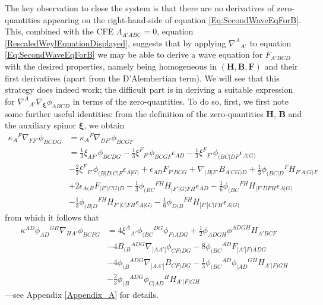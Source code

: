\documentclass[10pt,a4paper]{article}
\theoremstyle{plain}
\def\bmB{{\bm B}}
\def\bmF{{\bm F}}
\def\bmH{{\bm H}}
\begin{document}
The key observation to close the system is that there are no derivatives of zero-quantities
appearing on the right-hand-side of equation \eqref{Eq:SecondWaveEqForB}. This,
combined with the CFE $\Lambda_{A'ABC}=0$, equation \eqref{RescaledWeylEquationDisplayed},
suggests
that by applying $\nabla^A{}_{A'}$ to equation
\eqref{Eq:SecondWaveEqForB} we may be able to derive a wave equation
for $F_{A'BCD}$ with the desired properties, namely being homogeneous
in $(\bmH, \bmB, \bmF)$ and their first derivatives (apart from the
D'Alembertian term). We will see that this strategy does indeed work;
the difficult part is in deriving a suitable expression for
$\nabla^A{}_{A'}\nabla_{\bm\xi}\phi_{ABCD}$ in terms of the zero-quantities. To do so, first, we first note some further useful identities: from the definition
of the zero-quantities $\bmH$, $\bmB$ and the auxiliary spinor
$\bm\xi$, we obtain
\begin{align}
    \kappa_{A}{}^{F} \nabla_{FF'}\phi_{BCDG} &=\kappa_{A}{}^{F}
    \nabla_{DF'}\phi_{BCGF} \nonumber\\ &= \tfrac{1}{3} \xi_{AF'}
    \phi_{BCDG} - \tfrac{1}{3} \xi^{F}{}_{F'} \phi_{BCGF}
    \epsilon_{AD} - \tfrac{1}{3}
    \xi^{F}{}_{F'}\phi_{(BC|DF}\epsilon_{A|G)} \nonumber \\ & -
    \tfrac{2}{3} \xi^{F}{}_{F'}\phi_{(B|D|C|F}\epsilon_{A|G)} +
    \epsilon_{AD} F_{F'BCG} + \nabla_{(B|F'}B_{A|CG)D} + \tfrac{1}{3}
    \phi_{(BC|D}{}^{F}H_{F'A|G)F} \nonumber \\& + 2
    \epsilon_{A(B}F_{|F'\vert CG)D} - \tfrac{1}{3}
    \phi_{(BC}{}^{FH}H_{|F'|G)FH}\epsilon_{AD} - \tfrac{1}{6}
    \phi_{(BC}{}^{FH}H_{|F'DFH}\epsilon_{A|G)} \nonumber\\ & -
    \tfrac{1}{3} \phi_{(B|D}{}^{FH}H_{F'|C|FH}\epsilon_{A|G)} -
    \tfrac{1}{6}
    \phi_{D(B}{}^{FH}H_{|F'|C|FH}\epsilon_{A|G)}\label{Eq:MiscIdentity2}
\end{align}
from which it follows that 
\begin{align}
    \kappa^{AD} \phi_{AD}{}^{GH} \nabla_{HA'}\phi_{BCFG} &= 4
    \xi^{A}{}_{A'}\phi_{(BC}{}^{DG}\phi_{F)ADG} + \tfrac{1}{2}
    \phi_{ADGH} \phi^{ADGH} H_{A'BCF} \nonumber\\ & - 4
    B_{(B}{}^{ADG}\nabla_{|AA'|}\phi_{CF)DG} - 8
    \phi_{(BC}{}^{AD}F_{|A'|F)ADG}\nonumber \\ & - 4
    \phi_{(B}{}^{ADG}\nabla_{|AA'|}B_{CF)DG} - \tfrac{1}{3}
    \phi_{(BC}{}^{AD}\phi_{|AD}{}^{GH}H_{A'|F)GH}\nonumber \\ & -
    \tfrac{2}{3}
    \phi_{(B}{}^{ADG}\phi_{C|AD}{}^{H}H_{A'|F)GH} \label{Eq:MiscIdentity3}
\end{align}
---see Appendix \ref{Appendix_A} for details.
\\
\end{document}
